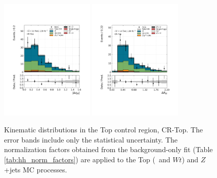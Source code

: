 \begin{figure}[!htb]
    \includegraphics[width=0.4\textwidth]{figures/search_hh/bkg_estimate/crvr/crtop/crtoptest_deta_ll}
    \includegraphics[width=0.4\textwidth]{figures/search_hh/bkg_estimate/crvr/crtop/crtoptest_dRll}
    \caption{
    Kinematic distributions in the Top control region, CR-Top.
    The error bands include only the statistical uncertainty.
    The normalization factors obtained from the background-only fit (Table \ref{tab:hh_norm_factors}) are applied
    to the Top (\ttbar~and $Wt$) and $Z$+jets MC processes.
    }
    \label{fig:crtop_kin_plots_0}
\end{figure}
